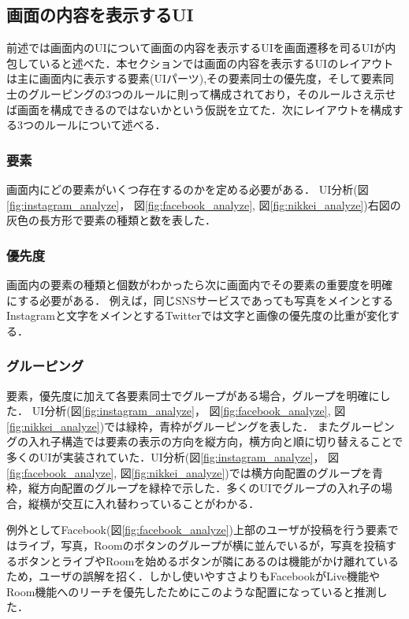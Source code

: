\subsection{画面の内容を表示するUI}
前述では画面内のUIについて画面の内容を表示するUIを画面遷移を司るUIが内包していると述べた．本セクションでは画面の内容を表示するUIのレイアウトは主に画面内に表示する要素(UIパーツ),その要素同士の優先度，そして要素同士のグルーピングの3つのルールに則って構成されており，そのルールさえ示せば画面を構成できるのではないかという仮説を立てた．次にレイアウトを構成する3つのルールについて述べる．
\subsubsection{要素}
画面内にどの要素がいくつ存在するのかを定める必要がある．
UI分析(図\ref{fig:instagram_analyze}， 図\ref{fig:facebook_analyze}, 図\ref{fig:nikkei_analyze})右図の灰色の長方形で要素の種類と数を表した．
\subsubsection{優先度}
画面内の要素の種類と個数がわかったら次に画面内でその要素の重要度を明確にする必要がある．
例えば，同じSNSサービスであっても写真をメインとするInstagramと文字をメインとするTwitterでは文字と画像の優先度の比重が変化する．


\subsubsection{グルーピング}
要素，優先度に加えて各要素同士でグループがある場合，グループを明確にした．
UI分析(図\ref{fig:instagram_analyze}， 図\ref{fig:facebook_analyze}, 図\ref{fig:nikkei_analyze})では緑枠，青枠がグルーピングを表した．
またグルーピングの入れ子構造では要素の表示の方向を縦方向，横方向と順に切り替えることで多くのUIが実装されていた．UI分析(図\ref{fig:instagram_analyze}， 図\ref{fig:facebook_analyze}, 図\ref{fig:nikkei_analyze})では横方向配置のグループを青枠，縦方向配置のグループを緑枠で示した．多くのUIでグループの入れ子の場合，縦横が交互に入れ替わっていることがわかる．

例外としてFacebook(図\ref{fig:facebook_analyze})上部のユーザが投稿を行う要素ではライブ，写真，Roomのボタンのグループが横に並んでいるが，写真を投稿するボタンとライブやRoomを始めるボタンが隣にあるのは機能がかけ離れているため，ユーザの誤解を招く．しかし使いやすさよりもFacebookがLive機能やRoom機能へのリーチを優先したためにこのような配置になっていると推測した．

